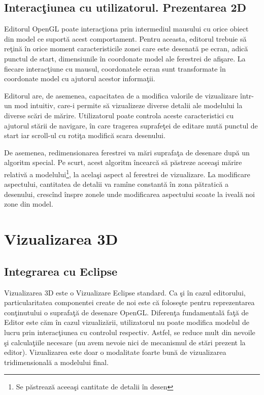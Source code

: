\subsection{Interacţiunea cu utilizatorul. Prezentarea 2D}
Editorul OpenGL poate interacţiona prin intermediul mausului cu orice obiect din
model ce suportă acest comportament. Pentru aceasta, editorul trebuie să reţină
în orice moment caracteristicile zonei care este desenată pe ecran, adică
punctul de start, dimensiunile în coordonate model ale ferestrei de afişare. La
fiecare interacţiune cu mausul, coordonatele ecran sunt transformate în
coordonate model cu ajutorul acestor informaţii.

Editorul are, de asemenea, capacitatea de a modifica valorile de vizualizare
într-un mod intuitiv, care-i permite să vizualizeze diverse detalii ale
modelului la diverse scări de mărire. Utilizatorul poate controla aceste
caracteristici cu ajutorul stării de navigare, în care tragerea suprafeţei de
editare mută punctul de start iar scroll-ul cu rotiţa modifică scara desenului.

De asemenea, redimensionarea ferestrei va mări suprafaţa de desenare după un
algoritm special. Pe scurt, acest algoritm încearcă să păstreze aceeaşi mărire
relativă a modelului\footnote{Se păstrează aceeaşi cantitate de detalii în
desen}, la acelaşi aspect al ferestrei de vizualizare. La modificare aspectului,
cantitatea de detalii va ramîne constantă în zona pătratică a desenului,
crescînd înspre zonele unde modificarea aspectului scoate la iveală noi zone din
model.

\section{Vizualizarea 3D}
\label{section:impl-view}

\subsection{Integrarea cu Eclipse}
Vizualizarea 3D este o Vizualizare Eclipse standard. Ca şi în cazul editorului,
particularitatea componentei create de noi este că foloseşte pentru
reprezentarea conţinutului o suprafaţă de desenare OpenGL. Diferenţa
fundamentală faţă de Editor este căm în cazul vizualizării, utilizatorul nu
poate modifica modelul de lucru prin interacţiunea cu controlul respectiv.
Astfel, se reduce mult din nevoile şi calculaţiile necesare (nu avem nevoie nici
de mecanismul de stări prezent la editor). Vizualizarea este doar o modalitate
foarte bună de vizualizarea tridimensională a modelului final.

